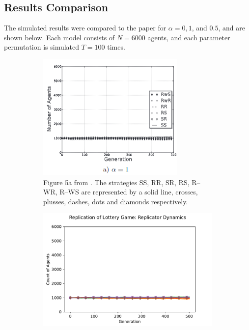 \subsection{Results Comparison}
The simulated results were compared to the paper for $\alpha = 0, 1$, and $ 0.5$, and are shown below. Each model consists of $N=6000$ agents, and each parameter permutation is simulated $T=100$ times. \\

\FloatBarrier 
\begin{figure}[!h]
  \begin{subfigure}[b]{0.45\textwidth}
    \includegraphics[width=\textwidth]{images/lottery1.png}
    \caption{Figure 5a from \cite{RN30}. The strategies SS, RR, SR, RS, R--WR, R--WS are represented by a solid line, crosses, plusses, dashes, dots and diamonds respectively. }
    \label{lottery1}
  \end{subfigure}
  \hfill
  \begin{subfigure}[b]{0.45\textwidth}
    \includegraphics[width=1.25\textwidth]{images/lottery1_me.pdf}

\end{subfigure}
\end{figure}
